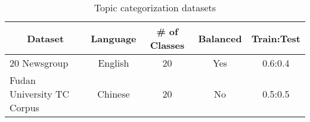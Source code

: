 \begin{table}[h]
\footnotesize
\centering
\caption{Topic categorization datasets}
\label{tab:tc_data}
\begin{tabular}{|l|c|c|c|c|}
	\hline
	\multicolumn{1}{|c|}{Dataset} & Language & \# of Classes & Balanced & Train:Test \\ \hline
	20 Newsgroup                  & English  & 20            & Yes      & 0.6:0.4    \\ \hline
	Fudan University TC Corpus    & Chinese  & 20            & No       & 0.5:0.5    \\ \hline
\end{tabular}
\end{table}